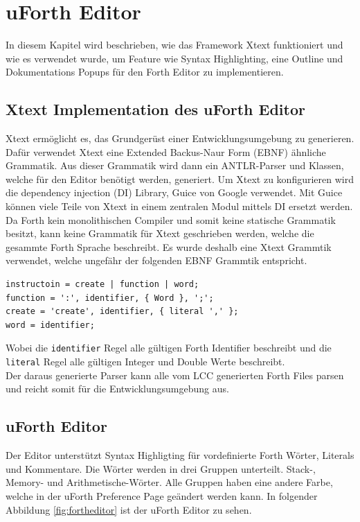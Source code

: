 \chapter{uForth Editor}
\label{chap:fortheditor}
In diesem Kapitel wird beschrieben, wie das Framework Xtext funktioniert und wie es verwendet wurde, um Feature wie Syntax Highlighting, eine Outline und Dokumentations Popups für den Forth Editor zu implementieren.

\section{Xtext Implementation des uForth Editor}
Xtext ermöglicht es, das Grundgerüst einer Entwicklungsumgebung zu generieren. Dafür verwendet Xtext eine Extended Backus-Naur Form (EBNF) ähnliche Grammatik. Aus dieser Grammatik wird dann ein ANTLR-Parser und Klassen, welche für den Editor benötigt werden, generiert. Um Xtext zu konfigurieren wird die dependency injection (DI) Library, Guice von Google verwendet. Mit Guice können viele Teile von Xtext in einem zentralen Modul mittels DI ersetzt werden.\\
Da Forth kein monolithischen Compiler und somit keine statische Grammatik besitzt, kann keine Grammatik für Xtext geschrieben werden, welche die gesammte Forth Sprache beschreibt. Es wurde deshalb eine Xtext Grammtik verwendet, welche ungefähr der folgenden EBNF Grammtik entspricht.

\begin{verbatim}
instructoin = create | function | word;
function = ':', identifier, { Word }, ';';
create = 'create', identifier, { literal ',' };
word = identifier;
\end{verbatim}

Wobei die \verb!identifier! Regel alle gültigen Forth Identifier beschreibt und die \verb!literal! Regel alle gültigen Integer und Double Werte beschreibt.
\\
Der daraus generierte Parser kann alle vom LCC generierten Forth Files parsen und reicht somit für die Entwicklungsumgebung aus. 

\newpage
\section{uForth Editor}
Der Editor unterstützt Syntax Highligting für vordefinierte Forth Wörter, Literals und Kommentare. Die Wörter werden in drei Gruppen unterteilt. Stack-, Memory- und Arithmetische-Wörter. Alle Gruppen haben eine andere Farbe, welche in der uForth Preference Page geändert werden kann. In folgender Abbildung \ref{fig:fortheditor} ist der uForth Editor zu sehen.


